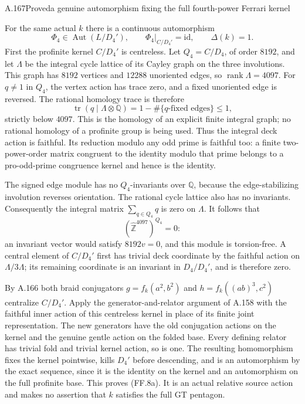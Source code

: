 \begin{statement}{A.167}{Proved}{a genuine automorphism fixing the full fourth-power Ferrari kernel}
\end{statement}
For the same actual $k$ there is a continuous automorphism
\[
 \boxed{\quad \Phi_4\in\operatorname{Aut}(L/D_4'),
        \qquad \Phi_4|_{C/D_4'}=\mathrm{id},
        \qquad\Delta(k)=1.\quad}
 \tag{FF.8a}
\]
First the profinite kernel $C/D_4'$ is centreless. Let
$Q_4=C/D_4$, of order $8192$, and let $\Lambda$ be the
integral cycle lattice of its Cayley graph on the three
involutions. This graph has $8192$ vertices and $12288$
unoriented edges, so $\operatorname{rank}\Lambda=4097$.
For $q\ne1$ in $Q_4$, the vertex action has trace zero,
and a fixed unoriented edge is reversed. The rational
homology trace is therefore
\[
         \operatorname{tr}(q\mid\Lambda\otimes\mathbb Q)
                     =1-\#\{q\text{-fixed edges}\}\leq1,
\]
strictly below $4097$. This is the homology of an explicit
finite integral graph; no rational homology of a profinite
group is being used. Thus the integral deck action is
faithful. Its reduction modulo any odd prime is faithful
too: a finite two-power-order matrix congruent to the
identity modulo that prime belongs to a pro-odd-prime
congruence kernel and hence is the identity.

The signed edge module has no $Q_4$-invariants over
$\mathbb Q$, because the edge-stabilizing involution
reverses orientation. The rational cycle lattice also
has no invariants. Consequently the integral matrix
$\sum_{q\in Q_4}q$ is zero on $\Lambda$. It follows that
\[
                 (\widehat{\mathbb Z}^{4097})^{Q_4}=0:
\]
an invariant vector would satisfy $8192v=0$, and this
module is torsion-free. A central element of $C/D_4'$
first has trivial deck coordinate by the faithful action
on $\Lambda/3\Lambda$; its remaining coordinate is an
invariant in $D_4/D_4'$, and is therefore zero.

By A.166 both braid conjugators
$g=f_k(a^2,b^2)$ and $h=f_k((ab)^3,c^2)$ centralize
$C/D_4'$. Apply the generator-and-relator argument of
A.158 with the faithful inner action of this centreless
kernel in place of its finite joint representation.
The new generators have the old conjugation actions
on the kernel and the genuine gentle action on the
folded base. Every defining relator has trivial fold
and trivial kernel action, so is one. The resulting
homomorphism fixes the kernel pointwise, kills $D_4'$
before descending, and is an automorphism by the exact
sequence, since it is the identity on the kernel and
an automorphism on the full profinite base. This proves
(FF.8a). It is an actual relative source action and makes
no assertion that $k$ satisfies the full GT pentagon.
